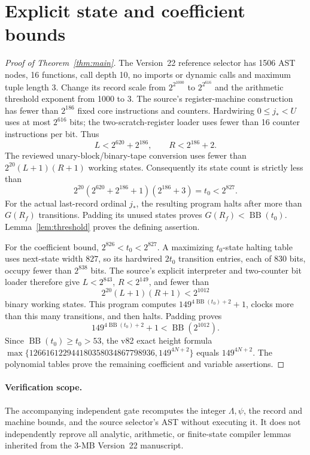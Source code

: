 \documentclass[11pt]{article}
\newcommand{\BB}{\operatorname{BB}}
\begin{document}
\section{Explicit state and coefficient bounds}
\begin{proof}[Proof of Theorem~\ref{thm:main}]
The Version~22 reference selector has 1506 AST nodes, 16 functions,
call depth 10, no imports or dynamic calls and maximum tuple length 3.
Change its record scale from \(2^{2^{1000}}\) to \(2^{2^{616}}\)
and the arithmetic threshold exponent from 1000 to 3.
The source's register-machine construction has fewer than
\(2^{186}\) fixed core instructions and counters.
Hardwiring \(0\le j_*<U\) uses at most \(2^{616}\) bits;
the two-scratch-register loader uses fewer than 16 counter
instructions per bit. Thus
\[
L<2^{620}+2^{186},\qquad R<2^{186}+2.
\]
The reviewed unary-block/binary-tape conversion uses fewer than
\(2^{20}(L+1)(R+1)\) working states. Consequently its state count
is strictly less than
\[
2^{20}(2^{620}+2^{186}+1)(2^{186}+3)=t_0<2^{827}.
\]
For the actual last-record ordinal \(j_*\), the resulting program
halts after more than \(G(R_f)\) transitions. Padding its unused
states proves \(G(R_f)<\BB(t_0)\).
Lemma~\ref{lem:threshold} proves the defining assertion.

For the coefficient bound, \(2^{826}<t_0<2^{827}\).
A maximizing \(t_0\)-state halting table uses next-state width
\(827\), so its hardwired \(2t_0\) transition entries, each of
\(830\) bits, occupy fewer than \(2^{838}\) bits.
The source's explicit interpreter and two-counter bit loader
therefore give \(L<2^{843}\), \(R<2^{149}\), and fewer than
\[
2^{20}(L+1)(R+1)<2^{1012}
\]
binary working states. This program computes
\(149^{4\BB(t_0)+2}+1\), clocks more than this many transitions,
and then halts. Padding proves
\[
149^{4\BB(t_0)+2}+1<\BB(2^{1012}).
\]
Since \(\BB(t_0)\ge t_0>53\), the v82 exact height formula
\(\max\{126616122944180358034867798936,149^{4N+2}\}\)
equals \(149^{4N+2}\). The polynomial tables prove
the remaining coefficient and variable assertions.
\end{proof}

\paragraph{Verification scope.}
The accompanying independent gate recomputes the integer
\(\Lambda,\psi\), the record and machine bounds, and the source
selector's AST without executing it. It does not independently
reprove all analytic, arithmetic, or finite-state compiler
lemmas inherited from the 3-MB Version~22 manuscript.
\end{document}
